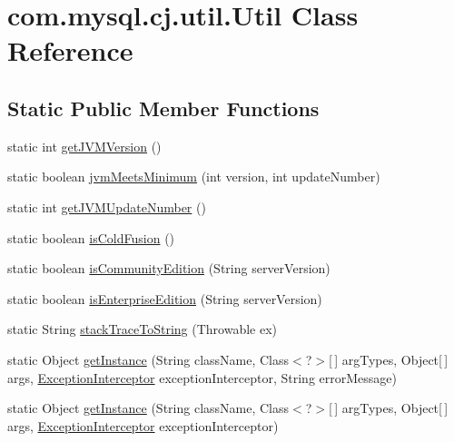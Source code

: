 \hypertarget{classcom_1_1mysql_1_1cj_1_1util_1_1_util}{}\section{com.\+mysql.\+cj.\+util.\+Util Class Reference}
\label{classcom_1_1mysql_1_1cj_1_1util_1_1_util}
\subsection*{Static Public Member Functions}
\begin{DoxyCompactItemize}
\item 
static int \mbox{\hyperlink{classcom_1_1mysql_1_1cj_1_1util_1_1_util_a8a0cafdd6a8954f0e9f56d53b20891f0}{get\+J\+V\+M\+Version}} ()
\item 
static boolean \mbox{\hyperlink{classcom_1_1mysql_1_1cj_1_1util_1_1_util_a132de3963fbece2d0e5858f0b420f318}{jvm\+Meets\+Minimum}} (int version, int update\+Number)
\item 
static int \mbox{\hyperlink{classcom_1_1mysql_1_1cj_1_1util_1_1_util_a34479078f5d6fd33e4b2ca262144ec25}{get\+J\+V\+M\+Update\+Number}} ()
\item 
static boolean \mbox{\hyperlink{classcom_1_1mysql_1_1cj_1_1util_1_1_util_a6af100ac590976d34eef802f9511a22f}{is\+Cold\+Fusion}} ()
\item 
static boolean \mbox{\hyperlink{classcom_1_1mysql_1_1cj_1_1util_1_1_util_ae6f8c91f805d5d3960a40c0a2892092e}{is\+Community\+Edition}} (String server\+Version)
\item 
static boolean \mbox{\hyperlink{classcom_1_1mysql_1_1cj_1_1util_1_1_util_a544537a70dee543f33219f1641be7c75}{is\+Enterprise\+Edition}} (String server\+Version)
\item 
static String \mbox{\hyperlink{classcom_1_1mysql_1_1cj_1_1util_1_1_util_af56476861014cdc8d214eb1440cfdf9e}{stack\+Trace\+To\+String}} (Throwable ex)
\item 
static Object \mbox{\hyperlink{classcom_1_1mysql_1_1cj_1_1util_1_1_util_a2596886e40a0b168c30d81fe2777a583}{get\+Instance}} (String class\+Name, Class$<$?$>$\mbox{[}$\,$\mbox{]} arg\+Types, Object\mbox{[}$\,$\mbox{]} args, \mbox{\hyperlink{interfacecom_1_1mysql_1_1cj_1_1exceptions_1_1_exception_interceptor}{Exception\+Interceptor}} exception\+Interceptor, String error\+Message)
\item 
static Object \mbox{\hyperlink{classcom_1_1mysql_1_1cj_1_1util_1_1_util_a73976bd0506adf686764aa027e085bb3}{get\+Instance}} (String class\+Name, Class$<$?$>$\mbox{[}$\,$\mbox{]} arg\+Types, Object\mbox{[}$\,$\mbox{]} args, \mbox{\hyperlink{interfacecom_1_1mysql_1_1cj_1_1exceptions_1_1_exception_interceptor}{Exception\+Interceptor}} exception\+Interceptor)

\end{DoxyCompactItemize}

